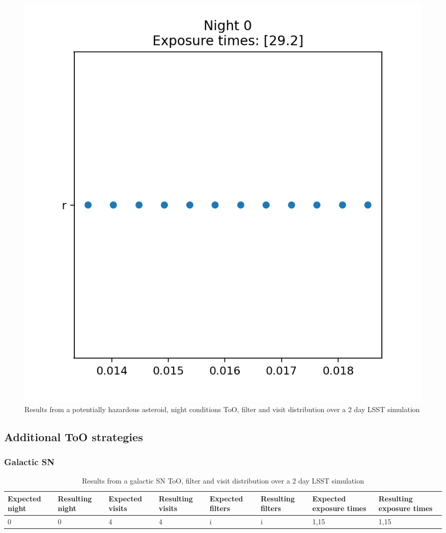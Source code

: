 \begin{figure}
    \centering
    \includegraphics[width=\linewidth]{figures/validationTests/SVRequired/PHANightFilterPlot.png}
    \caption{Results from a potentially hazardous asteroid, night conditions ToO, filter and visit distribution over a 2 day LSST simulation}
    \label{fig:PHANightFilterResult}
\end{figure}
\newpage

\subsection{Additional ToO strategies}

\subsubsection{Galactic SN}

\begin{table}[]
\centering
\begin{adjustbox}{max width=\linewidth}
\begin{tabular}{|l|l|l|l|l|l|l|l|}
\hline
Expected night & Resulting night & Expected visits & Resulting visits & Expected filters & Resulting filters & Expected exposure times & Resulting exposure times \\ \hline
0              & 0               & 4               & 4                & i                & i                 & 1,15                    & 1,15                     \\ \hline
\end{tabular}
\end{adjustbox}
\caption{Results from a galactic SN ToO, filter and visit distribution over a 2 day LSST simulation}
\label{tab:GalacticSNResults}
\end{table}

